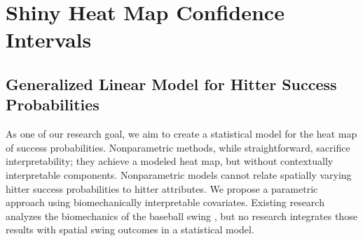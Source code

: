 % 
% 
% 
% 
% 
% 
% 
% 
% 
% 
% 
% 
% 
% 

\section{Shiny Heat Map Confidence Intervals}


\subsection{Generalized Linear Model for Hitter Success Probabilities} %

As one of our research goal, we aim to create a statistical model for the heat map of success probabilities. Nonparametric methods, while straightforward, sacrifice interpretability; they achieve a modeled heat map, but without contextually interpretable components. Nonparametric models cannot relate spatially varying hitter success probabilities to hitter attributes. We propose a parametric approach using biomechanically interpretable covariates. Existing research analyzes the biomechanics of the baseball swing \citep{Welch1995}, but no research integrates those results with spatial swing outcomes in a statistical model.

